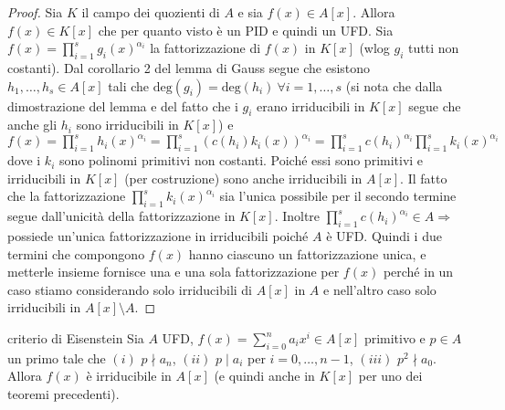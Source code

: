 \begin{proof}
    Sia $K$ il campo dei quozienti di $A$ e sia $f(x) \in A[x]$. Allora $f(x) \in K[x]$ che per quanto visto è un PID e quindi un UFD. Sia $f(x) = \prod_{i=1}^s g_i(x)^{\alpha_i}$ la fattorizzazione di $f(x)$ in $K[x]$ (wlog $g_i$ tutti non costanti). Dal corollario 2 del lemma di Gauss segue che esistono $h_1, \dots, h_s \in A[x]$ tali che $\text{deg}(g_i) = \text{deg}(h_i) \ \forall i = 1,\dots,s$ (si nota che dalla dimostrazione del lemma e del fatto che i $g_i$ erano irriducibili in $K[x]$ segue che anche gli $h_i$ sono irriducibili in $K[x]$) e $f(x) = \prod_{i=1}^s h_i(x)^{\alpha_i} = \prod_{i=1}^s (c(h_i)k_i(x))^{\alpha_i} = \prod_{i=1}^s c(h_i)^{\alpha_i} \prod_{i=1}^s k_i(x)^{\alpha_i}$ dove i $k_i$ sono polinomi primitivi non costanti. Poiché essi sono primitivi e irriducibili in $K[x]$ (per costruzione) sono anche irriducibili in $A[x]$. Il fatto che la fattorizzazione $\prod_{i=1}^s k_i(x)^{\alpha_i}$ sia l'unica possibile per il secondo termine segue dall'unicità della fattorizzazione in $K[x]$. Inoltre $\prod_{i=1}^s c(h_i)^{\alpha_i} \in A \Rightarrow $ possiede un'unica fattorizzazione in irriducibili poiché $A$ è UFD. Quindi i due termini che compongono $f(x)$ hanno ciascuno un fattorizzazione unica, e metterle insieme fornisce una e una sola fattorizzazione per $f(x)$ perché in un caso stiamo considerando solo irriducibili di $A[x]$ in $A$ e nell'altro caso solo irriducibili in $A[x] \setminus A$. 
\end{proof}
\begin{theorem}{criterio di Eisenstein}
    Sia $A$ UFD, $f(x) = \sum_{i=0}^n a_i x^i \in A[x]$ primitivo e $p\in A$ un primo tale che $(i)$ $p \nmid a_n$, $(ii)$ $p \mid a_i$ per $i=0,\dots,n-1$, $(iii)$ $p^2 \nmid a_0$. Allora $f(x)$ è irriducibile in $A[x]$ (e quindi anche in $K[x]$ per uno dei teoremi precedenti). 
\end{theorem}
